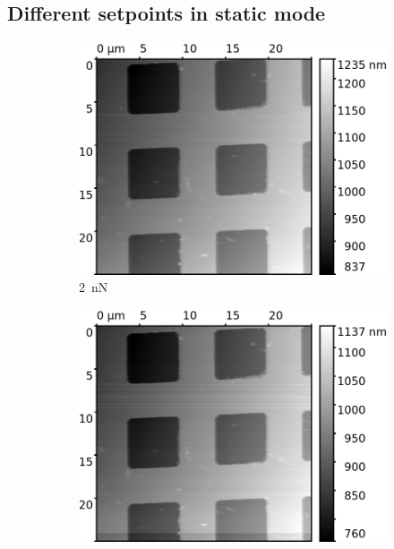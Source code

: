 \documentclass[11pt,a4paper]{article}
\begin{document}
\newpage
\begin{appendices}
\section{Different setpoints in static mode}\label{app:static_mode_setpoint}

\begin{figure}[H]
\centering
\begin{subfigure}[b]{0.48\textwidth}
\includegraphics[width=\textwidth]{static_mode_setpoint_2}
\caption{\SI{2}{\nano\N}}
\end{subfigure}
\begin{subfigure}[b]{0.48\textwidth}
\includegraphics[width=\textwidth]{static_mode_setpoint_5}

\end{subfigure}
\end{figure}
\end{appendices}
\end{document}
